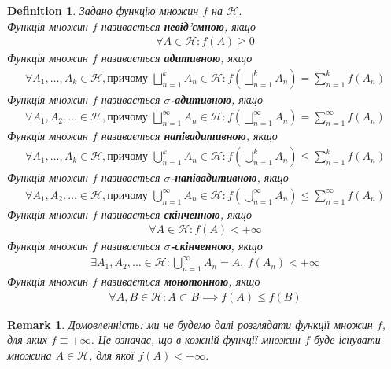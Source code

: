 \documentclass[a4paper, 10pt]{article}
\theoremstyle{theoremdd}
\newtheorem{definition}[theorem]{Definition}
\newtheorem{remark}[theorem]{Remark}
\begin{document}
\begin{definition}
Задано функцію множин $f$ на $\mathcal{H}$.\\
Функція множин $f$ називається \textbf{невід'ємною}, якщо
\begin{align*}
\forall A \in \mathcal{H}: f(A) \geq 0
\end{align*}
Функція множин $f$ називається \textbf{адитивною}, якщо
\begin{align*}
\forall A_1,\dots,A_k \in \mathcal{H}, \text{причому } \bigsqcup_{n=1}^k A_n \in \mathcal{H}: f\left( \bigsqcup_{n=1}^k A_n \right) = \sum_{n=1}^k f(A_n)
\end{align*}
Функція множин $f$ називається \textbf{$\sigma$-адитивною}, якщо
\begin{align*}
\forall A_1,A_2,\dots \in \mathcal{H}, \text{причому } \bigsqcup_{n=1}^\infty A_n \in \mathcal{H}: f\left( \bigsqcup_{n=1}^\infty A_n \right) = \sum_{n=1}^\infty f(A_n)
\end{align*}
Функція множин $f$ називається \textbf{напівадитивною}, якщо
\begin{align*}
\forall A_1,\dots,A_k \in \mathcal{H}, \text{причому } \bigcup_{n=1}^k A_n \in \mathcal{H}: f\left( \bigcup_{n=1}^k A_n \right) \leq \sum_{n=1}^k f(A_n)
\end{align*}
Функція множин $f$ називається \textbf{$\sigma$-напівадитивною}, якщо
\begin{align*}
\forall A_1,A_2,\dots \in \mathcal{H}, \text{причому } \bigcup_{n=1}^\infty A_n \in \mathcal{H}: f\left( \bigcup_{n=1}^\infty A_n \right) \leq \sum_{n=1}^\infty f(A_n)
\end{align*}
Функція множин $f$ називається \textbf{скінченною}, якщо
\begin{align*}
\forall A \in \mathcal{H}: f(A) < +\infty
\end{align*}
Функція множин $f$ називається \textbf{$\sigma$-скінченною}, якщо
\begin{align*}
\exists A_1,A_2, \dots \in \mathcal{H}: \bigcup_{n=1}^\infty A_n = A,\ f(A_n) < +\infty
\end{align*}
Функція множин $f$ називається \textbf{монотонною}, якщо
\begin{align*}
\forall A,B \in \mathcal{H}: A \subset B \implies f(A) \leq f(B)
\end{align*} 
\end{definition}

\begin{remark}
Домовленність: ми не будемо далі розглядати функції множин $f$, для яких $f \equiv +\infty$. Це означає, що в кожній функції множин $f$ буде існувати множина $A \in \mathcal{H}$, для якої $f(A) < +\infty$.
\end{remark}
\end{document}
